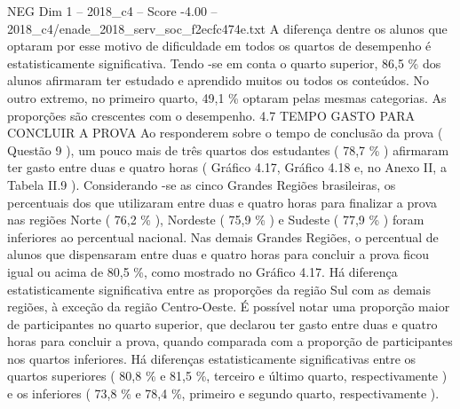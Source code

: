 \begin{textsample}{NEG Dim 1 – 2018\_c4 – Score -4.00 – 2018\_c4/enade\_2018\_serv\_soc\_f2ecfc474e.txt}
A diferença dentre os alunos que optaram por esse motivo de dificuldade em todos os quartos de desempenho é estatisticamente significativa.
Tendo -se em conta o quarto superior, 86,5 \% dos alunos afirmaram ter estudado e aprendido muitos ou todos os conteúdos.
No outro extremo, no primeiro quarto, 49,1 \% optaram pelas mesmas categorias.
As proporções são crescentes com o desempenho. 4.7 TEMPO GASTO PARA CONCLUIR A PROVA Ao responderem sobre o tempo de conclusão da prova ( Questão 9 ), um pouco mais de três quartos dos estudantes ( 78,7 \% ) afirmaram ter gasto entre duas e quatro horas ( Gráfico 4.17, Gráfico 4.18 e, no Anexo II, a Tabela II.9 ).
Considerando -se as cinco Grandes Regiões brasileiras, os percentuais dos que utilizaram entre duas e quatro horas para finalizar a prova nas regiões Norte ( 76,2 \% ), Nordeste ( 75,9 \% ) e Sudeste ( 77,9 \% ) foram inferiores ao percentual nacional.
Nas demais Grandes Regiões, o percentual de alunos que dispensaram entre duas e quatro horas para concluir a prova ficou igual ou acima de 80,5 \%, como mostrado no Gráfico 4.17.
Há diferença estatisticamente significativa entre as proporções da região Sul com as demais regiões, à exceção da região Centro-Oeste.
É possível notar uma proporção maior de participantes no quarto superior, que declarou ter gasto entre duas e quatro horas para concluir a prova, quando comparada com a proporção de participantes nos quartos inferiores.
Há diferenças estatisticamente significativas entre os quartos superiores ( 80,8 \% e 81,5 \%, terceiro e último quarto, respectivamente ) e os inferiores ( 73,8 \% e 78,4 \%, primeiro e segundo quarto, respectivamente ).

\end{textsample}
